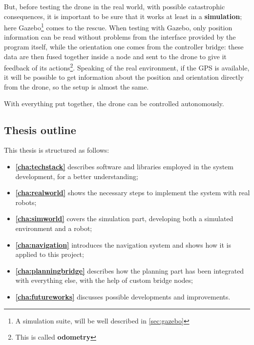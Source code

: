 But, before testing the drone in the real world, with possible catastrophic consequences, it is important to be sure that it works at least in a \textbf{simulation}; here Gazebo\footnote{A simulation suite, will be well described in \autoref{sec:gazebo}} comes to the rescue. When testing with Gazebo, only position information can be read without problems from the interface provided by the program itself, while the orientation one comes from the controller bridge: these data are then fused together inside a node and sent to the drone to give it feedback of its actions\footnote{This is called \textbf{odometry}}. Speaking of the real environment, if the GPS is available, it will be possible to get information about the position and orientation directly from the drone, so the setup is almost the same. 

With everything put together, the drone can be controlled autonomously.

\subsection{Thesis outline}

This thesis is structured as follows:
\begin{itemize}
  \item \textbf{\autoref{cha:techstack}} describes software and libraries employed in the system development, for a better understanding;
  \item \textbf{\autoref{cha:realworld}} shows the necessary steps to implement the system with real robots;
  \item \textbf{\autoref{cha:simworld}} covers the simulation part, developing both a simulated environment and a robot;
  \item \textbf{\autoref{cha:navigation}} introduces the navigation system and shows how it is applied to this project;
  \item \textbf{\autoref{cha:planningbridge}} describes how the planning part has been integrated with everything else, with the help of custom bridge nodes;
  \item \textbf{\autoref{cha:futureworks}} discusses possible developments and improvements.
\end{itemize}